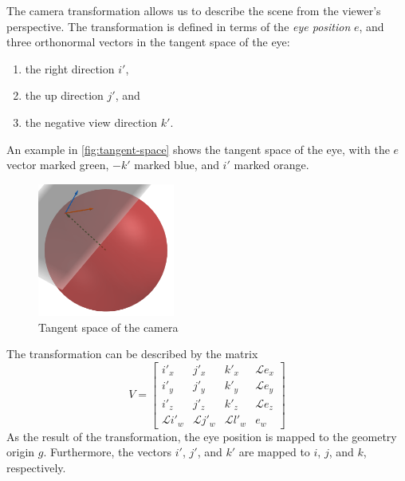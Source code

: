 The camera transformation allows us to describe the scene from the viewer's perspective.
The transformation is defined in terms of the \textit{eye position} $e$, and three orthonormal vectors in the tangent space of the eye:
\begin{enumerate}
    \item the right direction $i'$,
    \item the up direction $j'$, and
    \item the negative view direction $k'$.
\end{enumerate}
An example in \autoref{fig:tangent-space} shows the tangent space of the eye, with the $e$ vector marked green, $-k'$ marked blue, and $i'$ marked orange.\\
\begin{figure}[!htb]
    \centering
    \includegraphics[width=0.4\textwidth]{chapters/theoretical_foundations/sections/non-eudlidean-spaces/resources/tangent-space.png}
    \caption{Tangent space of the camera}
    \label{fig:tangent-space}
\end{figure}
The transformation can be described by the matrix
\begin{equation} \label{eq:view-matrix}
    V =
    \begin{bmatrix}
        i'_x            & j'_x            & k'_x            & \mathcal{L}e_x \\
        i'_y            & j'_y            & k'_y            & \mathcal{L}e_y \\
        i'_z            & j'_z            & k'_z            & \mathcal{L}e_z \\
        \mathcal{L}i'_w & \mathcal{L}j'_w & \mathcal{L}l'_w & e_w
    \end{bmatrix}
\end{equation}
As the result of the transformation, the eye position is mapped to the geometry origin $g$.
Furthermore, the vectors $i'$, $j'$, and $k'$ are mapped to $i$, $j$, and $k$, respectively.

